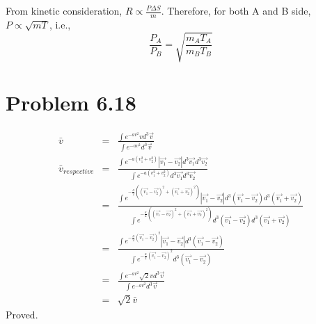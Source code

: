 \documentclass{article}
\begin{document}
	From kinetic consideration, $ R \propto \frac{P \Delta S}{m} $. Therefore, for both A and B side, $ P \propto \sqrt{mT} $, i.e.,
	\begin{equation}
		\frac{P_A}{P_B}=\sqrt{\frac{m_AT_A}{m_BT_B}}
	\end{equation}
	


\section*{Problem 6.18}
\begin{eqnarray*}
\bar{v}&=&\frac{\int e^{-a v^2}v d^3\vec{v}}{\int e^{-a v^2} d^3\vec{v}}  \\
\bar{v}_{respective}&=&\frac{\int e^{-a (v^2_1+v^2_2)}|\vec{v_1}-\vec{v_2}| d^3\vec{v_1}d^3\vec{v_2}}{\int e^{-a (v^2_1+v^2_2)} d^3\vec{v_1}d^3\vec{v_2}}  \\
&=&\frac{\int e^{-\frac{a}{2} ((\vec{v_1}-\vec{v_2})^2+(\vec{v_1}+\vec{v_2})^2)}|\vec{v_1}-\vec{v_2}| d^3(\vec{v_1}-\vec{v_2})d^3(\vec{v_1}+\vec{v_2})}{\int e^{-\frac{a}{2} ((\vec{v_1}-\vec{v_2})^2+(\vec{v_1}+\vec{v_2})^2)} d^3(\vec{v_1}-\vec{v_2})d^3(\vec{v_1}+\vec{v_2})}  \\
&=&\frac{\int e^{-\frac{a}{2} (\vec{v_1}-\vec{v_2})^2}|\vec{v_1}-\vec{v_2}| d^3(\vec{v_1}-\vec{v_2})}{\int e^{-\frac{a}{2} (\vec{v_1}-\vec{v_2})^2} d^3(\vec{v_1}-\vec{v_2})}  \\
&=&\frac{\int e^{-a v^2}\sqrt{2}v d^3\vec{v}}{\int e^{-a v^2} d^3\vec{v}}  \\
&=&\sqrt{2}\bar{v}
\end{eqnarray*}
Proved.
\end{document}
